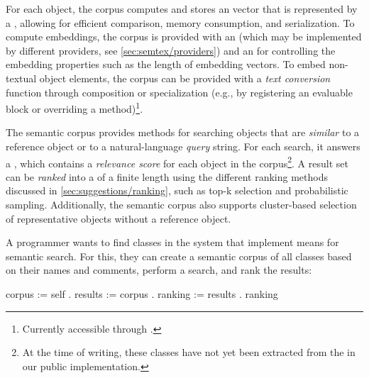For each object, the corpus computes and stores an  vector that is represented by a , allowing for efficient comparison, memory consumption, and serialization.
To compute embeddings, the corpus is provided with an  (which may be implemented by different providers, see \cref{sec:semtex/providers}) and an  for controlling the embedding properties such as the length of embedding vectors.
To embed non-textual object elements, the corpus can be provided with a \emph{text conversion} function through composition or specialization (e.g., by registering an evaluable block or overriding a method)\footnote{Currently accessible through .}.

The semantic corpus provides methods for searching objects that are \emph{similar} to a reference object or to a natural-language \emph{query} string.
For each search, it answers a , which contains a \emph{relevance score} for each object in the corpus\footnote{At the time of writing, these classes have not yet been extracted from the  in our public implementation.}.
A result set can be \emph{ranked} into a  of a finite length using the different ranking methods discussed in \cref{sec:suggestions/ranking}, such as top-k selection and probabilistic sampling.
Additionally, the semantic corpus also supports cluster-based selection of representative objects without a reference object.

\begin{example}[5]
	A programmer wants to find classes in the system that implement means for semantic search.
	For this, they can create a semantic corpus of all classes based on their names and comments, perform a search, and rank the results:

	\begin{multicode}
		corpus := self   \newline
		\null\qquad	{}  \newline
		\null\qquad	{} . \newline
		results := corpus  . \newline
		ranking := results  . \newline
		ranking 
	\end{multicode}
\end{example}


